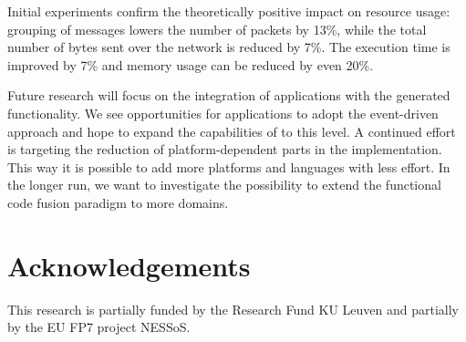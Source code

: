\documentclass[3p,times,procedia]{elsarticle}
\begin{document}
Initial experiments confirm the theoretically positive impact on resource
usage: grouping of messages lowers the number of packets by 13\%, while the
total number of bytes sent over the network is reduced by 7\%. The execution
time is improved by 7\% and memory usage can be reduced by even 20\%.

Future research will focus on the integration of applications with the
generated functionality. We see opportunities for applications to adopt the
event-driven approach and hope to expand the capabilities of \FOO to this
level. A continued effort is targeting the reduction of platform-dependent
parts in the implementation. This way it is possible to add more platforms and
languages with less effort. In the longer run, we want to investigate the
possibility to extend the functional code fusion paradigm to more domains.

\section{Acknowledgements}

This research is partially funded by the Research Fund KU Leuven and partially
by the EU FP7 project NESSoS\@.



\end{document}
